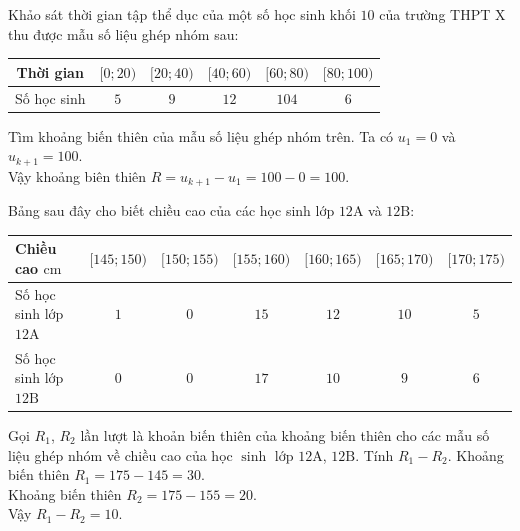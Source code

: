\begin{ex}%
	Khảo sát thời gian tập thể dục của một số học sinh khối $10$ của trường THPT X thu được mẫu số liệu ghép nhóm sau:
	\begin{center}
		\begin{tabular}{|c|c|c|c|c|c|}
			\hline Thời gian & $[0 ; 20)$ & $[20 ; 40)$ & $[40 ; 60)$ & $[60 ; 80)$ & $[80 ; 100)$ \\
			\hline Số học sinh & $5$ & $9$ & $12$ & $104$ & $6$ \\
			\hline
		\end{tabular}
	\end{center}
	Tìm khoảng biến thiên của mẫu số liệu ghép nhóm trên.
	\loigiai
	{
		Ta có $u_1=0$ và $u_{k+1}=100$.\\
		Vậy khoảng biên thiên $R=u_{k+1}-u_1=100-0=100$.
	}
\end{ex}

\begin{ex}%
	Bảng sau đây cho biết chiều cao của các học sinh lớp $12\mathrm{A}$ và $12\mathrm{B}$:
	\begin{center}
		\begin{tabular}{|l|c|c|c|c|c|c|}
			\hline 
			Chiều cao $\mathrm{cm}$ & $[145 ; 150)$ & $[150 ; 155)$ & $[155 ; 160)$ & $[160 ; 165)$ & $[165 ; 170)$ & $[170 ; 175)$ \\
			\hline 
			Số học sinh lớp $12\mathrm{A}$ & $1$ & $0$ & $15$ & $12$ & $10$ & $5$ \\
			\hline 
			Số học sinh lớp $12\mathrm{B}$ & $0$ & $0$ & $17$ & $10$ & $9$ & $6$ \\
			\hline
		\end{tabular}
	\end{center}
	Gọi $R_1$, $R_2$ lần lượt là khoản biến thiên của khoảng biến thiên cho các mẫu số liệu ghép nhóm về chiều cao của học $\sinh$ lớp $12\mathrm{A}$, $12\mathrm{B}$. Tính $R_1-R_2$.
	\loigiai
	{
		Khoảng biến thiên $R_1=175-145=30$.\\
		Khoảng biến thiên $R_2=175-155=20$.\\
		Vậy $R_1-R_2=10$.
	}
\end{ex}

